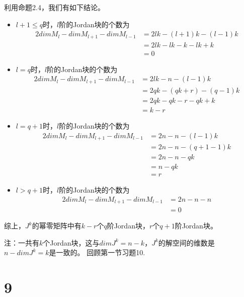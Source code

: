 \documentclass{article}
\begin{document}
利用命题2.4，我们有如下结论。
\begin{itemize}
  \item $l + 1 \leq q$时，$l$阶的Jordan块的个数为
        \begin{align*}
          2 dim M_l - dim M_{l + 1} - dim M_{l - 1}
           & = 2 l k - (l + 1) k - (l - 1) k \\
           & = 2lk - l k - k - lk + k        \\
           & = 0
        \end{align*}

  \item $l = q$时，$l$阶的Jordan块的个数为
        \begin{align*}
          2 dim M_l - dim M_{l + 1} - dim M_{l - 1}
           & = 2 lk - n - (l - 1) k        \\
           & = 2 qk - (qk + r) - (q - 1) k \\
           & = 2 qk - qk - r - qk + k      \\
           & = k - r
        \end{align*}

  \item $l = q + 1$时，$l$阶的Jordan块的个数为
        \begin{align*}
          2 dim M_l - dim M_{l + 1} - dim M_{l - 1}
           & = 2 n - n - (l - 1) k     \\
           & = 2 n - n - (q + 1 - 1) k \\
           & = 2 n - n - q k           \\
           & = n - qk                  \\
           & = r
        \end{align*}

  \item $l > q + 1$时，$l$阶的Jordan块的个数为
        \begin{align*}
          2 dim M_l - dim M_{l + 1} - dim M_{l - 1}
           & = 2 n - n - n \\
           & = 0
        \end{align*}
\end{itemize}

综上，$J^k$的幂零矩阵中有$k - r$个$q$阶Jordan块，$r$个$q + 1$阶Jordan块。

注：一共有$k$个Jordan块，这与$dim J^k = n - k$，$J^k$的解空间的维数是$n - dim J^k = k$是一致的。
回顾第一节习题10.

\section*{9}
\end{document}
